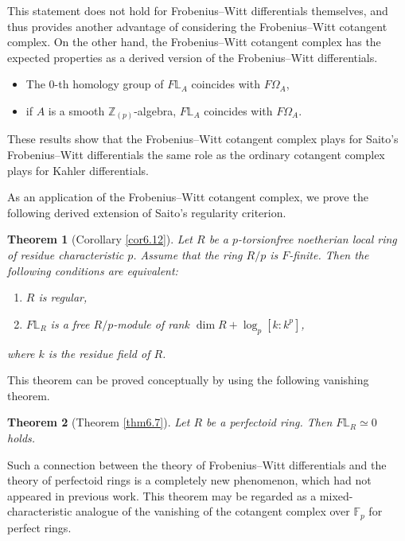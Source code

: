 \documentclass[11pt, a4paper]{amsart}
\theoremstyle{plain}
\newtheorem{theorem}{Theorem}[section]
\theoremstyle{definition}
\begin{document}
This statement does not hold for Frobenius--Witt differentials themselves, and thus provides another advantage of considering the Frobenius--Witt cotangent complex. On the other hand, the Frobenius--Witt cotangent complex has the expected properties as a derived version of the Frobenius--Witt differentials.
\begin{itemize}
    \item The $0$-th homology group of $F\mathbb L_A$ coincides with $F\Omega_A$,
    \item if $A$ is a smooth $\mathbb Z_{(p)}$-algebra, $F\mathbb L_A$ coincides with $F\Omega_A$.
\end{itemize}
These results show that the Frobenius--Witt cotangent complex plays for Saito's Frobenius--Witt differentials the same role as the ordinary cotangent complex plays for Kahler differentials.

As an application of the Frobenius--Witt cotangent complex, we prove the following derived extension of Saito’s regularity criterion.
 \begin{theorem}[Corollary \ref{cor6.12}]
     Let $R$ be a $p$-torsionfree noetherian local ring of residue characteristic $p$. Assume that the ring $R/p$ is $F$-finite. Then the following conditions are equivalent:\begin{enumerate}
        \item $R$ is regular,
        \item $F\mathbb L_R$ is a free $R/p$-module of rank $\operatorname{dim}R+\operatorname{log}_p[k:k^p]$,
    \end{enumerate}
    where $k$ is the residue field of $R$.
\end{theorem}

This theorem can be proved conceptually by using the following vanishing theorem.
\begin{theorem}[Theorem \ref{thm6.7}]
    Let $R$ be a perfectoid ring. Then $F\mathbb L_R\simeq 0$ holds.
\end{theorem}
Such a connection between the theory of Frobenius--Witt differentials and the theory of perfectoid rings is a completely new phenomenon, which had not appeared in previous work. This theorem may be regarded as a mixed-characteristic analogue of the vanishing of the cotangent complex over $\mathbb{F}_p$ for perfect rings.
\end{document}
